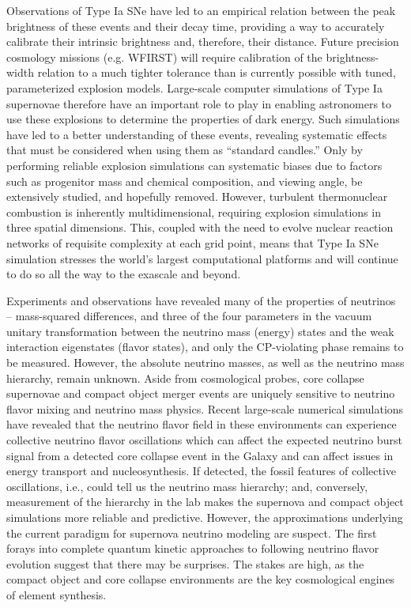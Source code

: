 Observations of Type Ia SNe have led to an empirical relation between
the peak brightness of these events and their decay time, providing a
way to accurately calibrate their intrinsic brightness and, therefore,
their distance. Future precision cosmology missions (e.g. WFIRST) will
require calibration of the brightness-width relation to a much tighter
tolerance than is currently possible with tuned, parameterized
explosion models. Large-scale computer simulations of Type Ia
supernovae therefore have an important role to play in enabling
astronomers to use these explosions to determine the properties of
dark energy.  Such simulations have led to a better understanding of
these events, revealing systematic effects that must be considered
when using them as ``standard candles.'' Only by performing reliable
explosion simulations can systematic biases due to factors such as
progenitor mass and chemical composition, and viewing angle, be
extensively studied, and hopefully removed. However, turbulent
thermonuclear combustion is inherently multidimensional, requiring
explosion simulations in three spatial dimensions. This, coupled with
the need to evolve nuclear reaction networks of requisite complexity
at each grid point, means that Type Ia SNe simulation stresses the
world's largest computational platforms and will continue to do so all
the way to the exascale and beyond.

Experiments and observations have revealed many of the properties of
neutrinos -- mass-squared differences, and three of the four
parameters in the vacuum unitary transformation between the neutrino
mass (energy) states and the weak interaction eigenstates (flavor
states), and only the CP-violating phase remains to be
measured. However, the absolute neutrino masses, as well as the
neutrino mass hierarchy, remain unknown. Aside from cosmological
probes, core collapse supernovae and compact object merger events are
uniquely sensitive to neutrino flavor mixing and neutrino mass
physics. Recent large-scale numerical simulations have revealed that
the neutrino flavor field in these environments can experience
collective neutrino flavor oscillations which can affect the expected
neutrino burst signal from a detected core collapse event in the
Galaxy and can affect issues in energy transport and
nucleosynthesis. If detected, the fossil features of collective
oscillations, i.e., could tell us the neutrino mass hierarchy; and,
conversely, measurement of the hierarchy in the lab makes the
supernova and compact object simulations more reliable and
predictive. However, the approximations underlying the current
paradigm for supernova neutrino modeling are suspect. The first forays
into complete quantum kinetic approaches to following neutrino flavor
evolution suggest that there may be surprises. The stakes are high, as
the compact object and core collapse environments are the key
cosmological engines of element synthesis.

